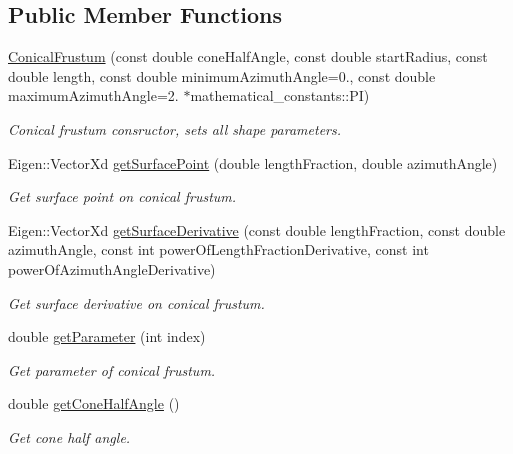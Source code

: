 \subsection*{Public Member Functions}
\begin{DoxyCompactItemize}
\item 
\hyperlink{classtudat_1_1geometric__shapes_1_1ConicalFrustum_ad51c0e034edf7ced17108ea730a415ba}{Conical\+Frustum} (const double cone\+Half\+Angle, const double start\+Radius, const double length, const double minimum\+Azimuth\+Angle=0., const double maximum\+Azimuth\+Angle=2. $\ast$mathematical\+\_\+constants\+::\+PI)
\begin{DoxyCompactList}\small\item\em Conical frustum consructor, sets all shape parameters. \end{DoxyCompactList}\item 
Eigen\+::\+Vector\+Xd \hyperlink{classtudat_1_1geometric__shapes_1_1ConicalFrustum_ab6327cb231caa7f62d74b05762cf8cbd}{get\+Surface\+Point} (double length\+Fraction, double azimuth\+Angle)
\begin{DoxyCompactList}\small\item\em Get surface point on conical frustum. \end{DoxyCompactList}\item 
Eigen\+::\+Vector\+Xd \hyperlink{classtudat_1_1geometric__shapes_1_1ConicalFrustum_a9ca3cf3b34ad29ab4a4093b5624ccb61}{get\+Surface\+Derivative} (const double length\+Fraction, const double azimuth\+Angle, const int power\+Of\+Length\+Fraction\+Derivative, const int power\+Of\+Azimuth\+Angle\+Derivative)
\begin{DoxyCompactList}\small\item\em Get surface derivative on conical frustum. \end{DoxyCompactList}\item 
double \hyperlink{classtudat_1_1geometric__shapes_1_1ConicalFrustum_a88a2541e7fb9d2afd86ef210a9c9e4f3}{get\+Parameter} (int index)
\begin{DoxyCompactList}\small\item\em Get parameter of conical frustum. \end{DoxyCompactList}\item 
double \hyperlink{classtudat_1_1geometric__shapes_1_1ConicalFrustum_a20e19aecfe45948272f2f571343a80ce}{get\+Cone\+Half\+Angle} ()
\begin{DoxyCompactList}\small\item\em Get cone half angle. \end{DoxyCompactList}\item 

\end{DoxyCompactItemize}
